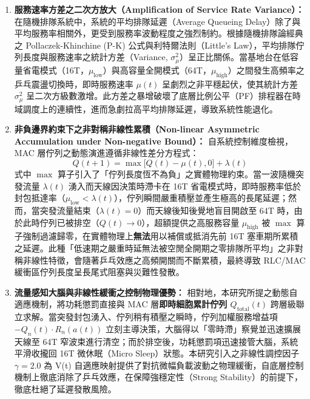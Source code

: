 \begin{enumerate}
    \item \textbf{服務速率方差之二次方放大（Amplification of Service Rate Variance）：}
    在隨機排隊系統中，系統的平均排隊延遲（Average Queueing Delay）除了與平均服務率相關外，更受到服務率波動程度之強烈制約。根據隨機排隊論經典之 Pollaczek-Khinchine (P-K) 公式與利特爾法則（Little's Law），平均排隊佇列長度與服務速率之統計方差（Variance, $\sigma_{\mu}^2$）呈正比關係。當基地台在低容量省電模式（16T，$ \mu_{\text{low}} $）與高容量全開模式（64T，$ \mu_{\text{high}} $）之間發生高頻率之乒乓震盪切換時，即時服務速率 $\mu(t)$ 呈劇烈之非平穩起伏，使其統計方差 $\sigma_{\mu}^2$ 呈二次方級數激增。此方差之暴增破壞了底層比例公平（PF）排程器在時域調度上的連續性，進而急劇拉高平均排隊延遲，導致系統性能退化。
    
    \item \textbf{非負邊界約束下之非對稱非線性累積（Non-linear Asymmetric Accumulation under Non-negative Bound）：}
    自系統控制維度檢視，MAC 層佇列之動態演進遵循非線性差分方程式：
    \begin{equation}
        Q(t+1) = \max \big[ Q(t) - \mu(t), 0 \big] + \lambda(t)
    \end{equation}
    式中 $\max$ 算子引入了「佇列長度恆不為負」之實體物理約束。當一波隨機突發流量 $\lambda(t)$ 湧入而天線因決策時滯卡在 16T 省電模式時，即時服務率低於封包抵達率（$\mu_{\text{low}} < \lambda(t)$），佇列瞬間嚴重積壓並產生極高的長尾延遲；然而，當突發流量結束（$\lambda(t) = 0$）而天線後知後覺地盲目開啟至 64T 時，由於此時佇列已被排空（$Q(t) \to 0$），超額提供之高服務容量 $\mu_{\text{high}}$ 被 $\max$ 算子強制過濾歸零，在實體物理上\textbf{無法}用以補償或抵消先前 16T 塞車期所累積之延遲。此種「低速期之嚴重時延無法被空閒全開期之零排隊所平均」之非對稱非線性特徵，會隨著乒乓效應之高頻開關而不斷累積，最終導致 RLC/MAC 緩衝區佇列長度呈長尾式阻塞與災難性發散。
    
    \item \textbf{流量感知大腦與非線性緩衝之控制物理優勢：}
    相對地，本研究所提之動態自適應機制，將功耗懲罰直接與 MAC 層\textbf{即時細胞累計佇列 $Q_{\text{total}}(t)$} 跨層級聯立求解。當突發封包湧入、佇列稍有積壓之瞬時，佇列加權服務增益項 $-Q_n(t) \cdot R_n(a(t))$ 立刻主導決策，大腦得以「零時滯」察覺並迅速擴展天線至 64T 窄波束進行清空；而於排空後，功耗懲罰項迅速接管大腦，系統平滑收攏回 16T 微休眠（Micro Sleep）狀態。本研究引入之非線性調控因子 $\gamma = 2.0$ 為 V(t) 自適應映射提供了對抗微幅負載波動之物理緩衝，自底層控制機制上徹底消除了乒乓效應，在保障強穩定性（Strong Stability）的前提下，徹底杜絕了延遲發散風險。
\end{enumerate}

